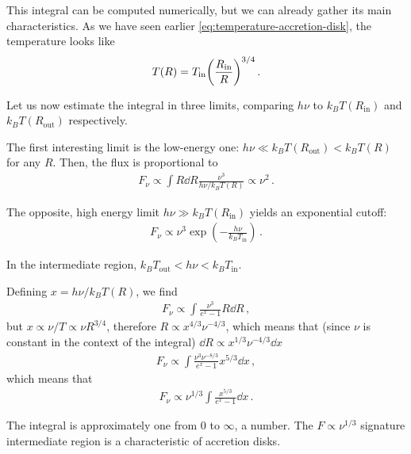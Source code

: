 \documentclass[main.tex]{subfiles}
\begin{document}
This integral can be computed numerically, but we can already gather its main characteristics. 
As we have seen earlier \eqref{eq:temperature-accretion-disk}, the temperature looks like 
%
\begin{align}
T(R) = T _{\text{in}} \qty( \frac{R _{\text{in}}}{R})^{3/4}
\,.
\end{align}

Let us now estimate the integral in three limits, comparing \(h \nu     \) to \(k_B T(R _{\text{in}})\) and \(k_B T (R _{\text{out}})\) respectively.

The first interesting limit is the low-energy one: \(h \nu \ll k_B T (R _{\text{out}}) < k_B T(R)\) for any \(R\).
Then, the flux is proportional to 
%
\begin{align}
F_\nu \propto \int R \dd{R} \frac{\nu^3}{h \nu / k_B T(R)} \propto \nu^2
\,.
\end{align}

The opposite, high energy limit \(h \nu \gg k_B T(R _{\text{in}})\) yields an exponential cutoff: 
%
\begin{align}
F_\nu \propto \nu^3 \exp(- \frac{h \nu }{k_B T _{\text{in}}})
\,.
\end{align}

In the intermediate region, \(k_B T _{\text{out}} < h \nu < k_B T _{\text{in}}\). 

Defining \(x = h \nu / k_B T(R)\), we find 
%
\begin{align}
F_\nu \propto \int \frac{\nu^3 }{e^{x} - 1} R \dd{R}
\,,
\end{align}
%
but \(x \propto \nu / T \propto \nu R^{3/4}\), therefore \(R \propto x^{4/3} \nu^{-4/3}\), which means that (since \(\nu \) is constant in the context of the integral) \(\dd{R} \propto x^{1/3} \nu^{-4/3} \dd{x}\) 
%
\begin{align}
F_\nu \propto \int \frac{\nu^3 \nu^{-8/3}}{e^{x}-1} x^{5/3} \dd{x} 
\,,
\end{align}
%
which means that 
%
\begin{align}
F_\nu \propto \nu^{1/3} \int \frac{x^{5/3}}{e^{x}-1} \dd{x}
\,.
\end{align}

The integral is approximately one from 0 to \(\infty \), a number. 
The \(F \propto \nu^{1/3}\) signature intermediate region is a characteristic of accretion disks.  
\end{document}
